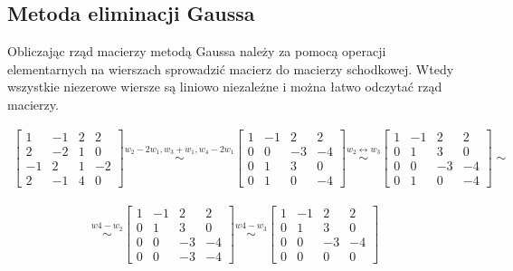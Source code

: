 \documentclass[12pt]{article}
\begin{document}
    \subsection{Metoda eliminacji Gaussa}

    Obliczając rząd macierzy metodą Gaussa należy za pomocą operacji elementarnych na wierszach sprowadzić macierz do
    macierzy schodkowej. Wtedy wszystkie niezerowe wiersze są liniowo niezależne i można łatwo odczytać rząd macierzy.

    \begin{align*}
        \begin{bmatrix}
            1 & -1 & 2 & 2\\
            2 & -2 & 1 & 0\\
            -1 & 2 & 1 & -2\\
            2 & -1 & 4 & 0
        \end{bmatrix}
        \stackrel{w_2 - 2w_1, w_3 + w_1, w_4 - 2w_1}{\sim}
        \begin{bmatrix}
            1 & -1 & 2 & 2\\
            0 & 0 & -3 & -4\\
            0 & 1 & 3 & 0\\
            0 & 1 & 0 & -4
        \end{bmatrix}
        \stackrel{w_2 \leftrightarrow w_3}{\sim}
        \begin{bmatrix}
            1 & -1 & 2 & 2\\
            0 & 1 & 3 & 0\\
            0 & 0 & -3 & -4\\
            0 & 1 & 0 & -4
        \end{bmatrix}
        \sim
    \end{align*}

    \begin{align*}
        \stackrel{w4 - w_2}{\sim}
        \begin{bmatrix}
            1 & -1 & 2 & 2\\
            0 & 1 & 3 & 0\\
            0 & 0 & -3 & -4\\
            0 & 0 & -3 & -4
        \end{bmatrix}
        \stackrel{w4 - w_3}{\sim}
        \begin{bmatrix}
            1 & -1 & 2 & 2\\
            0 & 1 & 3 & 0\\
            0 & 0 & -3 & -4\\
            0 & 0 & 0 & 0
        \end{bmatrix}
    \end{align*}
\end{document}
